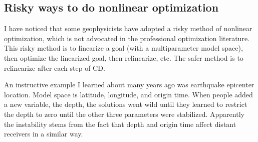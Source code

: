 


\subsection{Risky ways to do nonlinear optimization}
I have noticed that some geophysicists
have adopted a risky method of nonlinear optimization,
which is not advocated in the professional optimization literature.
This risky method is to linearize a goal
(with a multiparameter model space),
then optimize the linearized goal,
then relinearize, etc.
The safer method is to relinearize after each step of CD.
\par
An instructive example
I learned about many years ago was earthquake epicenter location.
Model space is latitude, longitude, and origin time.
When people added a new variable, the depth,
the solutions went wild
until they learned to restrict the depth to zero
until the other three parameters were stabilized.
Apparently the instability stems from the fact 
that depth and origin time affect distant receivers in a similar way.

